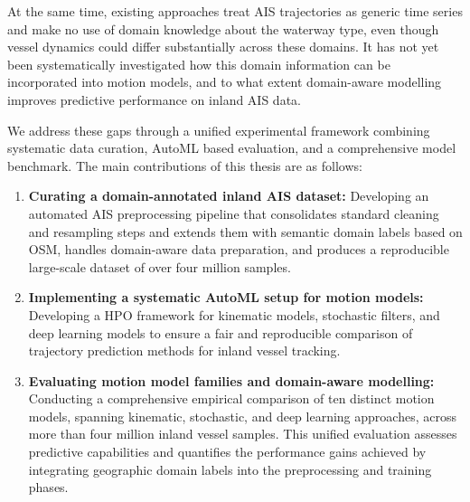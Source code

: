 
At the same time, %
existing approaches treat \ac{AIS} trajectories as generic time series and make no use of domain knowledge about the waterway type, even though vessel dynamics could differ substantially across these domains.
It has not yet been systematically investigated how this domain information can be incorporated into motion models, and to what extent domain-aware modelling improves predictive performance on inland \ac{AIS} data.%

We address these gaps through a unified experimental framework combining systematic data curation, \acs{AutoML} based evaluation, and a comprehensive model benchmark. The main contributions of this thesis are as follows:


\begin{enumerate}

  
  

  \item \textbf{Curating a domain-annotated inland AIS dataset:} 
  Developing an automated \ac{AIS} preprocessing pipeline that consolidates standard cleaning and resampling steps and extends them  with semantic domain labels based on \ac{OSM}, handles domain-aware data preparation, and produces a reproducible large-scale dataset of over four million samples.
  \item \textbf{Implementing a systematic \ac{AutoML} setup for motion models:} Developing a \ac{HPO} framework for kinematic models, stochastic filters, and deep learning models to ensure a fair and reproducible comparison of trajectory prediction methods for inland vessel tracking. 
  \item \textbf{Evaluating motion model families and domain-aware modelling:} Conducting a comprehensive empirical comparison of ten distinct motion models, spanning kinematic, stochastic, and deep learning approaches, across more than four million inland vessel samples. This unified evaluation assesses predictive capabilities and quantifies the performance gains achieved by integrating geographic domain labels into the preprocessing and training phases. 
\end{enumerate}


